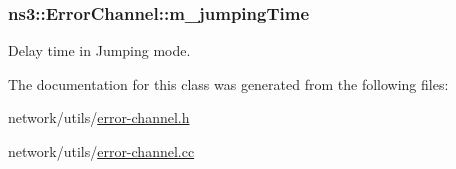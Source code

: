 \subsubsection[{\texorpdfstring{m\+\_\+jumping\+Time}{m_jumpingTime}}]{ ns3\+::\+Error\+Channel\+::m\+\_\+jumping\+Time\hspace{0.3cm}{\ttfamily [private]}}\hypertarget{classns3_1_1ErrorChannel_adae2b3ed8ec9a910225e27ea6da2a651}{}\label{classns3_1_1ErrorChannel_adae2b3ed8ec9a910225e27ea6da2a651}


Delay time in Jumping mode. 



The documentation for this class was generated from the following files\+:\begin{DoxyCompactItemize}
\item 
network/utils/\hyperlink{error-channel_8h}{error-\/channel.\+h}\item 
network/utils/\hyperlink{error-channel_8cc}{error-\/channel.\+cc}\end{DoxyCompactItemize}
